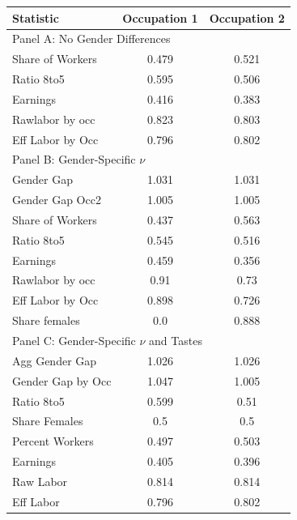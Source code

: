 \begin{tabular}{lcc}
\hline
Statistic & Occupation 1 & Occupation 2 \\
\hline
\multicolumn{3}{l}{Panel A: No Gender Differences} \\
Share of Workers & 0.479 & 0.521 \\
Ratio 8to5 & 0.595 & 0.506 \\
Earnings & 0.416 & 0.383 \\
Rawlabor by occ & 0.823 & 0.803 \\
Eff Labor by Occ & 0.796 & 0.802 \\
\hline
\multicolumn{3}{l}{Panel B: Gender-Specific $\nu$} \\
Gender Gap & 1.031 & 1.031 \\
Gender Gap Occ2 & 1.005 & 1.005 \\
Share of Workers & 0.437 & 0.563 \\
Ratio 8to5 & 0.545 & 0.516 \\
Earnings & 0.459 & 0.356 \\
Rawlabor by occ & 0.91 & 0.73 \\
Eff Labor by Occ & 0.898 & 0.726 \\
Share females & 0.0 & 0.888 \\
\hline
\multicolumn{3}{l}{Panel C: Gender-Specific $\nu$ and Tastes} \\
Agg Gender Gap & 1.026 & 1.026 \\
Gender Gap by Occ & 1.047 & 1.005 \\
Ratio 8to5 & 0.599 & 0.51 \\
Share Females & 0.5 & 0.5 \\
Percent Workers & 0.497 & 0.503 \\
Earnings & 0.405 & 0.396 \\
Raw Labor & 0.814 & 0.814 \\
Eff Labor & 0.796 & 0.802 \\
\hline
\end{tabular}
